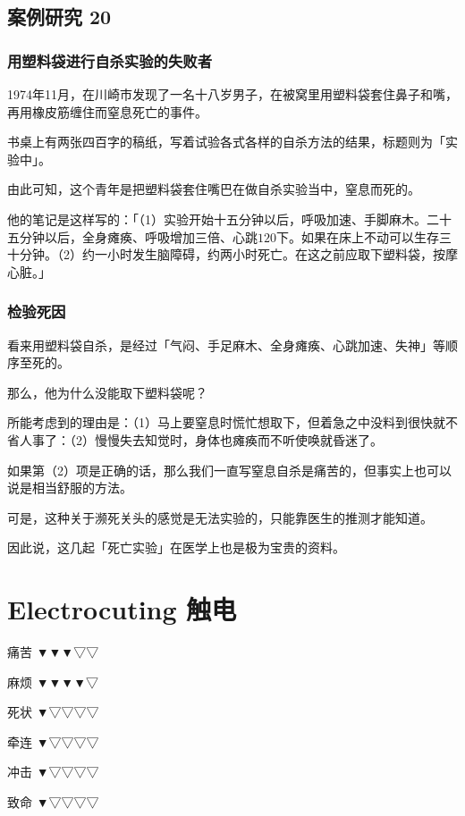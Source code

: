 \documentclass[UTF8]{ctexart}
\begin{document}
\subsection{案例研究 20}

\subsubsection*{用塑料袋进行自杀实验的失败者}

1974年11月，在川崎市发现了一名十八岁男子，在被窝里用塑料袋套住鼻子和嘴，再用橡皮筋缠住而窒息死亡的事件。

书桌上有两张四百字的稿纸，写着试验各式各样的自杀方法的结果，标题则为「实验中」。

由此可知，这个青年是把塑料袋套住嘴巴在做自杀实验当中，窒息而死的。

他的笔记是这样写的：「（1）实验开始十五分钟以后，呼吸加速、手脚麻木。二十五分钟以后，全身瘫痪、呼吸增加三倍、心跳$120$下。如果在床上不动可以生存三十分钟。（2）约一小时发生脑障碍，约两小时死亡。在这之前应取下塑料袋，按摩心脏。」

\subsubsection*{检验死因}

看来用塑料袋自杀，是经过「气闷、手足麻木、全身瘫痪、心跳加速、失神」等顺序至死的。

那么，他为什么没能取下塑料袋呢？

所能考虑到的理由是：（1）马上要窒息时慌忙想取下，但着急之中没料到很快就不省人事了：（2）慢慢失去知觉时，身体也瘫痪而不听使唤就昏迷了。

如果第（2）项是正确的话，那么我们一直写窒息自杀是痛苦的，但事实上也可以说是相当舒服的方法。

可是，这种关于濒死关头的感觉是无法实验的，只能靠医生的推测才能知道。 

因此说，这几起「死亡实验」在医学上也是极为宝贵的资料。

\newpage

\section{Electrocuting 触电}

痛苦 ▼▼▼▽▽

麻烦 ▼▼▼▼▽

死状 ▼▽▽▽▽

牵连 ▼▽▽▽▽

冲击 ▼▽▽▽▽

致命 ▼▽▽▽▽
\end{document}
